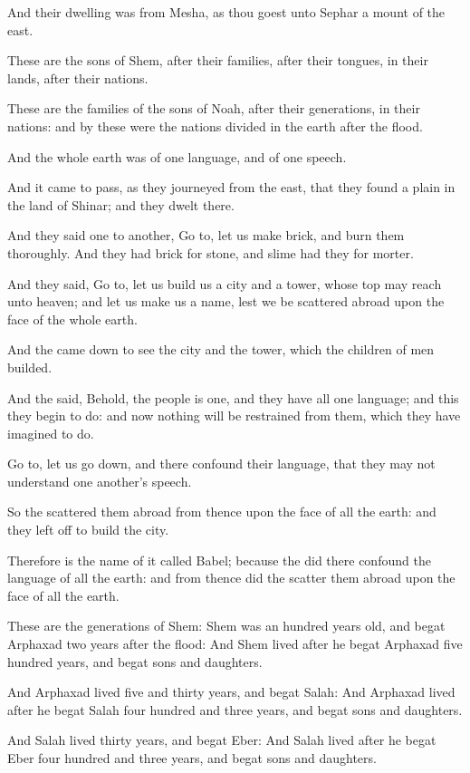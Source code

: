\Verse And their dwelling was from Mesha, as thou goest unto Sephar a mount of the east.

\Verse These are the sons of Shem, after their families, after their tongues, in their lands, after their nations.

\Verse These are the families of the sons of Noah, after their generations, in their nations: and by these were the nations divided in the earth after the flood.

\Chapter
\Verse And the whole earth was of one language, and of one speech.

\Verse And it came to pass, as they journeyed from the east, that they found a plain in the land of Shinar; and they dwelt there.

\Verse And they said one to another, Go to, let us make brick, and burn them thoroughly. And they had brick for stone, and slime had they for morter.

\Verse And they said, Go to, let us build us a city and a tower, whose top may reach unto heaven; and let us make us a name, lest we be scattered abroad upon the face of the whole earth.

\Verse And the \LORD came down to see the city and the tower, which the children of men builded.

\Verse And the \LORD said, Behold, the people is one, and they have all one language; and this they begin to do: and now nothing will be restrained from them, which they have imagined to do.

\Verse Go to, let us go down, and there confound their language, that they may not understand one another's speech.

\Verse So the \LORD scattered them abroad from thence upon the face of all the earth: and they left off to build the city.

\Verse Therefore is the name of it called Babel; because the \LORD did there confound the language of all the earth: and from thence did the \LORD scatter them abroad upon the face of all the earth.

\Verse These are the generations of Shem: Shem was an hundred years old, and begat Arphaxad two years after the flood: \Verse And Shem lived after he begat Arphaxad five hundred years, and begat sons and daughters.

\Verse And Arphaxad lived five and thirty years, and begat Salah: \Verse And Arphaxad lived after he begat Salah four hundred and three years, and begat sons and daughters.

\Verse And Salah lived thirty years, and begat Eber: \Verse And Salah lived after he begat Eber four hundred and three years, and begat sons and daughters.

